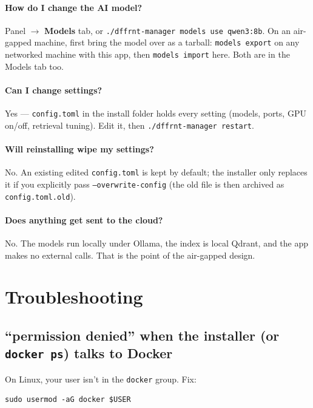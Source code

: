\documentclass[11pt,letterpaper]{article}
\let\oldsection\section
\renewcommand{\section}{\vspace{1em}\oldsection}
\begin{document}
\paragraph{How do I change the AI model?}
Panel $\rightarrow$ \textbf{Models} tab, or \texttt{./dffrnt-manager models
use qwen3:8b}. On an air-gapped machine, first bring the model over as a
tarball: \texttt{models export} on any networked machine with this app, then
\texttt{models import} here. Both are in the Models tab too.

\paragraph{Can I change settings?}
Yes --- \texttt{config.toml} in the install folder holds every setting
(models, ports, GPU on/off, retrieval tuning). Edit it, then
\texttt{./dffrnt-manager restart}.

\paragraph{Will reinstalling wipe my settings?}
No. An existing edited \texttt{config.toml} is kept by default; the installer
only replaces it if you explicitly pass \texttt{--overwrite-config} (the old
file is then archived as \texttt{config.toml.old}).

\paragraph{Does anything get sent to the cloud?}
No. The models run locally under Ollama, the index is local Qdrant, and the
app makes no external calls. That is the point of the air-gapped design.

\section{Troubleshooting}
\label{sec:troubleshooting}

\subsection{``permission denied'' when the installer (or \texttt{docker ps}) talks to Docker}

On Linux, your user isn't in the \texttt{docker} group. Fix:

\begin{lstlisting}
sudo usermod -aG docker $USER
\end{lstlisting}
\end{document}
